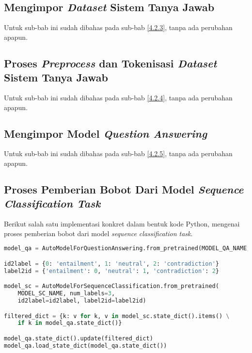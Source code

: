 \subsection{Mengimpor \emph{Dataset} Sistem Tanya Jawab}
\label{4.3.3}
Untuk sub-bab ini sudah dibahas pada sub-bab \ref{4.2.3}, tanpa ada perubahan apapun.

\subsection{Proses \emph{Preprocess} dan Tokenisasi \emph{Dataset} Sistem Tanya Jawab}
\label{4.3.4}
Untuk sub-bab ini sudah dibahas pada sub-bab \ref{4.2.4}, tanpa ada perubahan apapun.

\subsection{Mengimpor Model \emph{Question Answering}}
\label{4.3.5}
Untuk sub-bab ini sudah dibahas pada sub-bab \ref{4.2.5}, tanpa ada perubahan apapun.


\subsection{Proses Pemberian Bobot Dari Model \emph{Sequence Classification Task}}
\label{4.3.6}
Berikut salah satu implementasi konkret dalam bentuk kode Python, mengenai proses pemberian bobot dari model \emph{sequence classification task}.

\begin{lstlisting}[language=Python, caption=Proses pemberian bobot dari model \emph{sequence classification task}]
model_qa = AutoModelForQuestionAnswering.from_pretrained(MODEL_QA_NAME, num_labels=2)

id2label = {0: 'entailment', 1: 'neutral', 2: 'contradiction'}
label2id = {'entailment': 0, 'neutral': 1, 'contradiction': 2}

model_sc = AutoModelForSequenceClassification.from_pretrained(
    MODEL_SC_NAME, num_labels=3, 
    id2label=id2label, label2id=label2id)

filtered_dict = {k: v for k, v in model_sc.state_dict().items() \
    if k in model_qa.state_dict()}

model_qa.state_dict().update(filtered_dict)
model_qa.load_state_dict(model_qa.state_dict())
\end{lstlisting}

